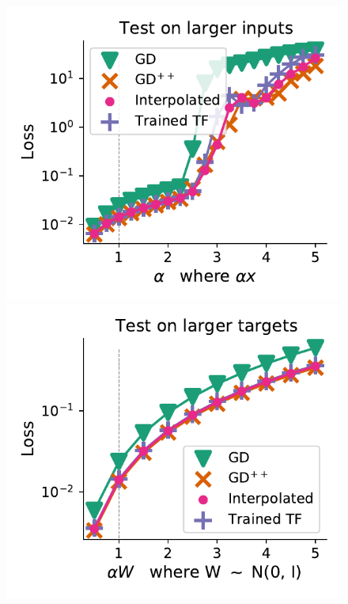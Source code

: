 \documentclass{article}
\theoremstyle{plain}
\theoremstyle{definition}
\theoremstyle{remark}
\begin{document}
\begin{figure}
\begin{center}
\begin{minipage}{.24\textwidth}
\begin{center}
  \end{center}
  \vspace{-10pt}
\end{minipage}
\begin{minipage}{.24\textwidth}
  \centering
  \begin{center}
    \includegraphics[width=1.\textwidth]{Final_figures/linear/ten_layers_rec/normal_12.pdf}
  \end{center}
  \vspace{-10pt}
\end{minipage}
\begin{minipage}{.24\textwidth}
  \centering
  \begin{center}
    \includegraphics[width=1.\textwidth]{Final_figures/linear/ten_layers_rec/ood_8.pdf}
  \end{center}
  \vspace{-10pt}
\end{minipage}
\end{center}


\end{figure}
\end{document}
